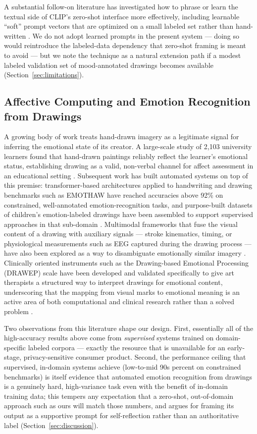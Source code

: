 \documentclass[10pt,twocolumn,letterpaper]{article}
\begin{document}
A substantial follow-on literature has investigated how to phrase or learn the textual side of CLIP's zero-shot interface more effectively, including learnable ``soft'' prompt vectors that are optimized on a small labeled set rather than hand-written \cite{zhou2022coop}. We do not adopt learned prompts in the present system --- doing so would reintroduce the labeled-data dependency that zero-shot framing is meant to avoid --- but we note the technique as a natural extension path if a modest labeled validation set of mood-annotated drawings becomes available (Section~\ref{sec:limitations}).

\subsection{Affective Computing and Emotion Recognition from Drawings}
\label{sec:related-affective}

A growing body of work treats hand-drawn imagery as a legitimate signal for inferring the emotional state of its creator. A large-scale study of 2{,}103 university learners found that hand-drawn paintings reliably reflect the learner's emotional status, establishing drawing as a valid, non-verbal channel for affect assessment in an educational setting \cite{handdrawn2022}. Subsequent work has built automated systems on top of this premise: transformer-based architectures applied to handwriting and drawing benchmarks such as EMOTHAW have reached accuracies above 92\% on constrained, well-annotated emotion-recognition tasks, and purpose-built datasets of children's emotion-labeled drawings have been assembled to support supervised approaches in that sub-domain \cite{handdrawn2022}. Multimodal frameworks that fuse the visual content of a drawing with auxiliary signals --- stroke kinematics, timing, or physiological measurements such as EEG captured during the drawing process --- have also been explored as a way to disambiguate emotionally similar imagery \cite{multimodalfusion2022}. Clinically oriented instruments such as the Drawing-based Emotional Processing (DRAWEP) scale have been developed and validated specifically to give art therapists a structured way to interpret drawings for emotional content, underscoring that the mapping from visual marks to emotional meaning is an active area of both computational and clinical research rather than a solved problem \cite{handdrawn2022}.

Two observations from this literature shape our design. First, essentially all of the high-accuracy results above come from \emph{supervised} systems trained on domain-specific labeled corpora --- exactly the resource that is unavailable for an early-stage, privacy-sensitive consumer product. Second, the performance ceiling that supervised, in-domain systems achieve (low-to-mid 90s percent on constrained benchmarks) is itself evidence that automated emotion recognition from drawings is a genuinely hard, high-variance task even with the benefit of in-domain training data; this tempers any expectation that a zero-shot, out-of-domain approach such as ours will match those numbers, and argues for framing its output as a supportive prompt for self-reflection rather than an authoritative label (Section~\ref{sec:discussion}).
\end{document}
